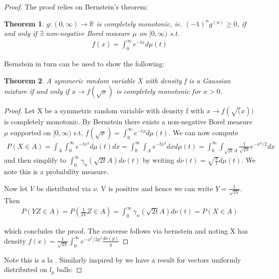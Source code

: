 \documentclass[10pt]{article}
\newcommand{\1}{\textbf{1}}
\newcommand{\R}{\mathbb{R}}
\newtheorem{theorem}{Theorem}
\theoremstyle{remark}
\theoremstyle{definition}
\begin{document}
\begin{proof}

The proof relies on Bernstein's theorem:

\begin{theorem}
	$g : (0,\infty) \to \R$ is completely monotonic, ie. $(-1)^ng^{(n)} \geq 0$, if and only if $\exists$ non-negative Borel measure $\mu$ on $[0,\infty)$ s.t.
	\begin{align*}
		f(x) = \int_0^{\infty} e^{-tx}d\mu(t)
	\end{align*}
\end{theorem}

Bernstein in turn can be used to show the following:

\begin{theorem}
	A symmeric random variable X with density f is a Gaussian mixture if and only if $x \to f(\sqrt{x})$ is completely monotonic for $x > 0$. 
\end{theorem}


\begin{proof}
	Let X be a symmetric random variable with density f with $x \to f(\sqrt(x))$ is completely monotonic. By Bernstein there exists a non-negative Borel measure $\mu$ supported on $[0,\infty)$ s.t. $f(\sqrt{x}) = \int_0^{\infty}e^{-tx}d\mu(t)$. We can now compute
	\begin{align*}
		P(X \in A) = \int_A \int_0^{\infty} e^{-tx^2}d\mu(t)dx = \int_0^{\infty}\int_A e^{-tx^2}dxd\mu(t) = \int_0^{\infty} \int_{\sqrt{2t}A} \frac{1}{\sqrt{2\pi}}e^{-x^2/2}dx
	\end{align*}
	and then simplify to $\int_0^{\infty}\gamma_n(\sqrt{2t}A)d\nu(t)$ by writing $d\nu(t) = \sqrt{\frac{\pi}{t}}d\mu(t)$. We note this is a probability measure.

	Now let $V$ be distributed via $\nu$. V is positive and hence we can write $Y = \frac{1}{\sqrt{2V}}$. Then
	\begin{align*}
		P(YZ \in A) = P(\frac{1}{2V} Z \in A) = \int_0^{\infty}\gamma_n(\sqrt{2t}A)d\nu(t) = P(X \in A)
	\end{align*}

	which concludes the proof. The converse follows via bernstein and noting X has density $f(x) = \frac{1}{\sqrt{2 \pi}} \int_0^{\infty} e^{-x^2/2y^2}\frac{d\nu(y)}{y}$
\end{proof}

Note this is a la \cite{LO}. Similarly inspired by \cite{BGMN} we have a result for vectors uniformly distributed on $l_p$ balls:


\end{proof}
\end{document}
